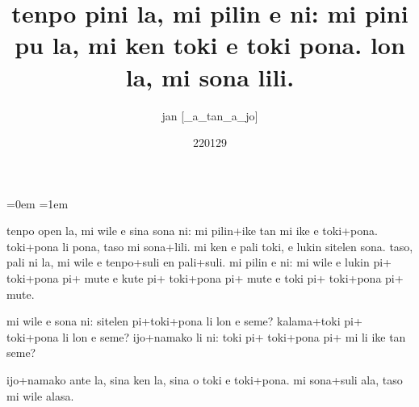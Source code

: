 \documentclass{article}
\title{tenpo pini la, mi pilin e ni: mi pini pu la, mi ken toki e toki pona. lon la, mi sona lili.}
\date{220129}
\author{jan {[\_a}\_tan\_a\_jo{]}}
\begin{document}
\parindent=0em
\parskip=1em

\maketitle

\large

tenpo open la, mi wile e sina sona ni: mi pilin+ike tan mi ike e toki+pona. toki+pona li pona, taso mi sona+lili.
mi ken e pali toki, e lukin sitelen sona. taso, pali ni la, mi wile e tenpo+suli en pali+suli. mi pilin e ni: mi wile e lukin pi+ toki+pona pi+ mute e kute pi+ toki+pona pi+ mute e toki pi+ toki+pona pi+ mute.

mi wile e sona ni: sitelen pi+toki+pona li lon e seme? kalama+toki pi+ toki+pona li lon e seme? ijo+namako li ni: toki pi+ toki+pona pi+ mi li ike tan seme?

ijo+namako ante la, sina ken la, sina o toki e toki+pona. mi sona+suli ala, taso mi wile alasa.
\end{document}
